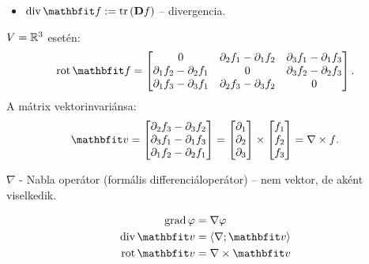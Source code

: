 \begin{blueBox}
\begin{itemize}
    \item $\Div \vfunc f := \operatorname{tr} \left( \DD f \right)$
          -- divergencia.
  \end{itemize}
  $V = \mathbb{R}^3$ esetén:
  $$
    \rot \vfunc f
    =
    \begin{bmatrix}
      0                               &
      \partial_2 f_1 - \partial_1 f_2 &
      \partial_3 f_1 - \partial_1 f_3
      \\
      \partial_1 f_2 - \partial_2 f_1 &
      0                               &
      \partial_3 f_2 - \partial_2 f_3
      \\
      \partial_1 f_3 - \partial_3 f_1 &
      \partial_2 f_3 - \partial_3 f_2 &
      0
    \end{bmatrix}
    \text.
  $$
  A mátrix vektorinvariánsa:
  \begin{equation*}
    \rvec v
    =
    \begin{bmatrix}
      \partial_2 f_3 - \partial_3 f_2 \\
      \partial_3 f_1 - \partial_1 f_3 \\
      \partial_1 f_2 - \partial_2 f_1
    \end{bmatrix}
    =
    \begin{bmatrix}
      \partial_1 \\
      \partial_2 \\
      \partial_3
    \end{bmatrix}
    \times
    \begin{bmatrix}
      f_1 \\
      f_2 \\
      f_3
    \end{bmatrix}
    =
    \nabla \times f
    \text.
  \end{equation*}

  $\nabla$ - Nabla operátor (formális differenciáloperátor)
  -- nem vektor, de aként viselkedik.
\end{blueBox}

\begin{note}
  \vspace{-1.5em}
  \begin{align*}
    \grad \varphi & = \nabla \varphi
    \\
    \Div \rvec v  & = \scalar{\nabla}{\rvec v}
    \\
    \rot \rvec v  & = \nabla \times \rvec v
  \end{align*}
\end{note}

